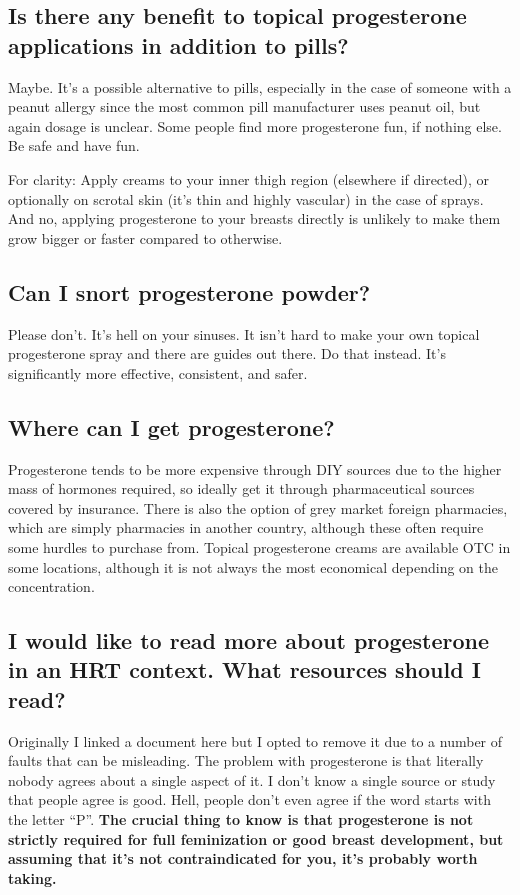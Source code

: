 \documentclass{article}
\begin{document}
\subsection{Is there any benefit to topical progesterone applications in addition to pills?}

Maybe. It's a possible alternative to pills, especially in the case of someone with a peanut allergy since the most common pill manufacturer uses peanut oil, but again dosage is unclear. Some people find more progesterone fun, if nothing else. Be safe and have fun.

For clarity: Apply creams to your inner thigh region (elsewhere if directed), or optionally on scrotal skin (it's thin and highly vascular) in the case of sprays. And no, applying progesterone to your breasts directly is unlikely to make them grow bigger or faster compared to otherwise. 

\subsection{Can I snort progesterone powder?}

Please don’t. It’s hell on your sinuses. It isn’t hard to make your own topical progesterone spray and there are guides out there. Do that instead. It’s significantly more effective, consistent, and safer.

\subsection{Where can I get progesterone?}

Progesterone tends to be more expensive through DIY sources due to the higher mass of hormones required, so ideally get it through pharmaceutical sources covered by insurance. There is also the option of grey market foreign pharmacies, which are simply pharmacies in another country, although these often require some hurdles to purchase from. Topical progesterone creams are available OTC in some locations, although it is not always the most economical depending on the concentration.

\subsection{I would like to read more about progesterone in an HRT context. What resources should I read?}\label{8-17}

Originally I linked a document here but I opted to remove it due to a number of faults that can be misleading. The problem with progesterone is that literally nobody agrees about a single aspect of it. I don't know a single source or study that people agree is good. Hell, people don't even agree if the word starts with the letter “P”. \textbf{The crucial thing to know is that progesterone is not strictly required for full feminization or good breast development, but assuming that it's not contraindicated for you, it's probably worth taking.}
\end{document}
